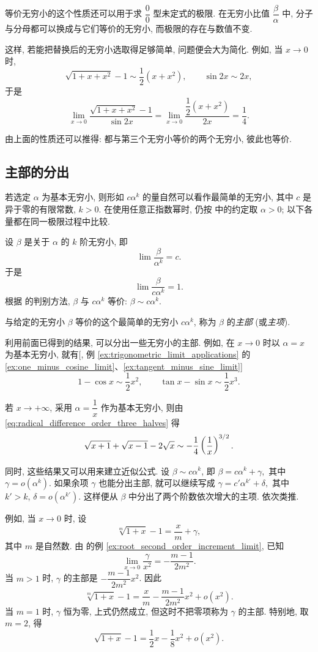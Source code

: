 等价无穷小的这个性质还可以用于求 $\dfrac00$ 型未定式的极限.
{\kaishu 在无穷小比值 $\dfrac\beta\alpha$ 中,
分子与分母都可以换成与它们等价的无穷小,
而极限的存在与数值不变.}

这样, 若能把替换后的无穷小选取得足够简单, 问题便会大为简化.
例如, 当 $x\to0$ 时,
$$
\sqrt{1+x+x^2}-1\sim\frac12(x+x^2),\qquad\sin2x\sim2x,
$$
于是
$$
\lim_{x\to0}\frac{\sqrt{1+x+x^2}-1}{\sin2x}
=\lim_{x\to0}\frac{\dfrac12(x+x^2)}{2x}=\frac14.
$$

由上面的性质还可以推得:
{\kaishu 都与第三个无穷小等价的两个无穷小, 彼此也等价.}

\subsection{主部的分出}\label{subsec:63}
若选定 $\alpha$ 为基本无穷小, 则形如 $c\alpha^k$ 的量自然可以看作最简单的无穷小,
其中 $c$ 是异于零的有限常数, $k>0$.
在使用任意正指数幂时, 仍按  中的约定取 $\alpha>0$;
以下各量都在同一极限过程中比较.

设 $\beta$ 是关于 $\alpha$ 的 $k$ 阶无穷小, 即
$$
\lim\frac{\beta}{\alpha^k}=c.
$$
于是
$$
\lim\frac{\beta}{c\alpha^k}=1.
$$
根据  的判别方法, $\beta$ 与 $c\alpha^k$ 等价:
$\beta\sim c\alpha^k$.

{\kaishu 与给定的无穷小 $\beta$ 等价的这个最简单的无穷小 $c\alpha^k$,
称为 $\beta$ 的\emph{主部} (或\emph{主项}).}
\label{def:principal_part_infinitesimal}

利用前面已得到的结果, 可以分出一些无穷小的主部.
例如, 在 $x\to0$ 时以 $\alpha=x$ 为基本无穷小, 就有[, 例 \ref{ex:trigonometric_limit_applications} 的
\ref{ex:one_minus_cosine_limit}、\ref{ex:tangent_minus_sine_limit}]
$$
1-\cos x\sim\frac12x^2,\qquad
\tan x-\sin x\sim\frac12x^3.
$$

若 $x\to+\infty$, 采用 $\alpha=\dfrac1x$ 作为基本无穷小,
则由 \eqref{eq:radical_difference_order_three_halves} 得
$$
\sqrt{x+1}+\sqrt{x-1}-2\sqrt{x}
\sim-\frac14\left( \frac1x \right)^{3/2}.
$$

同时, 这些结果又可以用来建立近似公式.
设
$
\beta\sim c\alpha^k$, 
即
$
\beta=c\alpha^k+\gamma,
$
其中 $\gamma=o(\alpha^k)$.
如果余项 $\gamma$ 也能分出主部, 就可以继续写成
$
\gamma=c'\alpha^{k'}+\delta,
$
其中 $k'>k$, $\delta=o(\alpha^{k'})$.
这样便从 $\beta$ 中分出了两个阶数依次增大的主项.
依次类推.

例如, 当 $x\to0$ 时, 设
$$
\sqrt[m]{1+x}-1=\frac xm+\gamma,
$$
其中 $m$ 是自然数.
由  的例 \ref{ex:root_second_order_increment_limit}, 已知
$$
\lim_{x\to0}\frac\gamma{x^2}=-\frac{m-1}{2m^2}.
$$
当 $m>1$ 时, $\gamma$ 的主部是 $-\dfrac{m-1}{2m^2}x^2$.
因此
\begin{equation}\label{eq:root_increment_second_order_expansion}
\sqrt[m]{1+x}-1=\frac xm-\frac{m-1}{2m^2}x^2+o(x^2).
\end{equation}
当 $m=1$ 时, $\gamma$ 恒为零, 上式仍然成立, 但这时不把零项称为 $\gamma$ 的主部.
特别地, 取 $m=2$, 得
$$
\sqrt{1+x}-1=\frac12x-\frac18x^2+o(x^2).
$$

